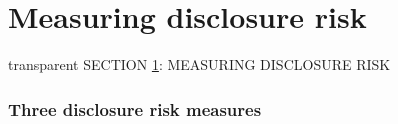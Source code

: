 \documentclass[t,8pt,utfx8]{beamer}
\begin{document}
\begin{spacing}{1.25}
\begin{frame}[t]
\end{frame}





\section{Measuring disclosure risk}\label{sec:disclosure}
\begin{frame}[c,plain]
\vskip-4mm
\begin{beamercolorbox}[wd=\boxwidth,ht=22.11mm]{transparent}%
    \vfill%
    \leftinsert%
    \MakeUppercase{Section \ref{sec:disclosure}: Measuring disclosure risk
} %
\end{beamercolorbox}
\vskip-3mm
\end{frame}

\begin{frame}[t]\frametitle{Three disclosure risk measures}


\end{frame}
\end{spacing}
\end{document}
